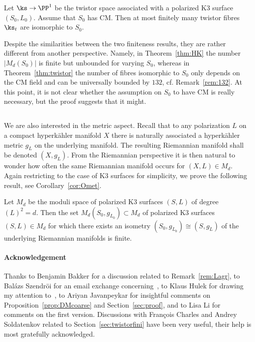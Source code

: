 \begin{theo}\label{thm:twistor}
Let $\ks\to\PP^1$ be the twistor space associated with
a polarized K3 surface $(S_0,L_0)$. Assume that $S_0$ has CM. Then at most finitely many twistor fibres $\ks_t$ are isomorphic to $S_0$.
\end{theo}

Despite the similarities between the two finiteness results, they are rather different from another perspective. Namely, in Theorem~\ref{thm:HK} the number $|M_d(S_0)|$ is finite but unbounded for varying $S_0$, whereas in Theorem~\ref{thm:twistor} the number of fibres isomorphic to $S_0$ only depends on the CM field and can be universally bounded by $132$, cf. Remark~\ref{rem:132}. At this point, it is not clear whether the assumption on $S_0$ to have CM is really necessary, but the proof suggests that it might.

\subsection{}
We are also interested in the metric aspect. Recall that to any polarization $L$ on a compact hyperk\"ahler manifold $X$ there is naturally associated a hyperk\"ahler metric $g_L$ on the underlying manifold. The resulting Riemannian manifold shall be denoted $(X,g_L)$. From the Riemannian perspective it is then natural to wonder how often the same Riemannian manifold occurs for $(X,L)\in M_d$. Again restricting to the case of K3 surfaces for simplicity, we prove the following result, see Corollary~\ref{cor:Omet}.

\begin{theo}
Let $M_d$ be the moduli space of polarized K3 surfaces $(S,L)$ of degree $(L)^2=d$. Then the set $M_d(S_0,g_{L_0})\subset M_d$ of polarized K3 surfaces $(S,L)\in M_d$ for which there exists an isometry $(S_0,g_{L_0})\cong (S,g_L)$ of the underlying Riemannian manifolds is finite.
\end{theo}

\paragraph*{Acknowledgement}
Thanks to Benjamin Bakker for a discussion related to Remark~\ref{rem:Lagr}, to Bal\'azs Szendr\"oi for an email exchange concerning~\cite{Szendroi}, to Klaus Hulek for drawing my attention to~\cite{La}, to Ariyan Javanpeykar for insightful comments on Proposition~\ref{prop:DMcoarse} and Section~\ref{sec:proof}, and to Lisa Li for comments on the first version. Discussions with Fran\c{c}ois Charles and Andrey Soldatenkov related to Section~\ref{sec:twistorfini} have been very useful, their help is most gratefully acknowledged.


